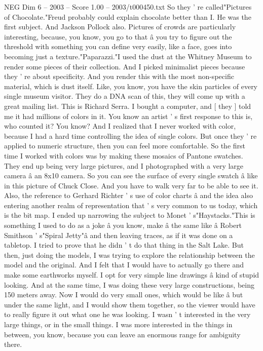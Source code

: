 \begin{textsample}{NEG Dim 6 – 2003 – Score 1.00 – 2003/t000450.txt}
So they ' re called"Pictures of Chocolate."Freud probably could explain chocolate better than I.
He was the first subject.
And Jackson Pollock also.
Pictures of crowds are particularly interesting, because, you know, you go to that â you try to figure out the threshold with something you can define very easily, like a face, goes into becoming just a texture."Paparazzi."I used the dust at the Whitney Museum to render some pieces of their collection.
And I picked minimalist pieces because they ' re about specificity.
And you render this with the most non-specific material, which is dust itself.
Like, you know, you have the skin particles of every single museum visitor.
They do a DNA scan of this, they will come up with a great mailing list.
This is Richard Serra.
I bought a computer, and [ they ] told me it had millions of colors in it.
You know an artist ' s first response to this is, who counted it?
You know?
And I realized that I never worked with color, because I had a hard time controlling the idea of single colors.
But once they ' re applied to numeric structure, then you can feel more comfortable.
So the first time I worked with colors was by making these mosaics of Pantone swatches.
They end up being very large pictures, and I photographed with a very large camera â an 8x10 camera.
So you can see the surface of every single swatch â like in this picture of Chuck Close.
And you have to walk very far to be able to see it.
Also, the reference to Gerhard Richter ' s use of color charts â and the idea also entering another realm of representation that ' s very common to us today, which is the bit map.
I ended up narrowing the subject to Monet ' s"Haystacks."This is something I used to do as a joke â you know, make â the same like â Robert Smithson ' s"Spiral Jetty"â and then leaving traces, as if it was done on a tabletop.
I tried to prove that he didn ' t do that thing in the Salt Lake.
But then, just doing the models, I was trying to explore the relationship between the model and the original.
And I felt that I would have to actually go there and make some earthworks myself.
I opt for very simple line drawings â kind of stupid looking.
And at the same time, I was doing these very large constructions, being 150 meters away.
Now I would do very small ones, which would be like â but under the same light, and I would show them together, so the viewer would have to really figure it out what one he was looking.
I wasn ' t interested in the very large things, or in the small things.
I was more interested in the things in between, you know, because you can leave an enormous range for ambiguity there.

\end{textsample}
